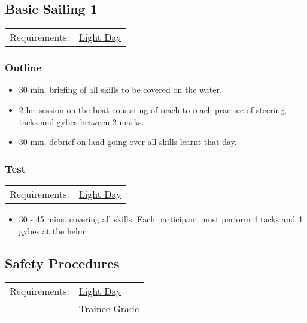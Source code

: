 \documentclass[12pt]{scrartcl}
\begin{document}
\subsection{Basic Sailing 1} \label{subsec:basic sailing 1}

\label{tab:basic sailing 1:requirements}
\begin{tabular}{ll}
	Requirements: & \hyperlink{condition:light day}{Light Day} \\
\end{tabular}

\subsubsection{Outline} \label{subsubsec:basic sailing 1:outline}

\begin{itemize}
	\item 30 min. briefing of all skills to be covered on the water.
	\item 2 hr. session on the boat consisting of reach to reach practice of steering, tacks and gybes between 2 marks.
	\item 30 min. debrief on land going over all skills learnt that day.
\end{itemize}

\subsubsection{Test} \label{subsubsec:basic sailing 1:test}

\label{tab:basic sailing:test:requirements}
\begin{tabular}{ll}
	Requirements: & \hyperlink{condition:light day}{Light Day} \\
\end{tabular}

\begin{itemize}
	\item 30 - 45 mins. covering all skills. Each participant must perform 4 tacks and 4 gybes at the helm.
\end{itemize}

\subsection{Safety Procedures} \label{subsec:safety procedures}

\label{tab:safety procedures:requirements}
\begin{tabular}{ll}
	Requirements: & \hyperlink{condition:light day}{Light Day} \\
	& \hyperlink{grade:trainee}{Trainee Grade} \\
\end{tabular}
\end{document}
